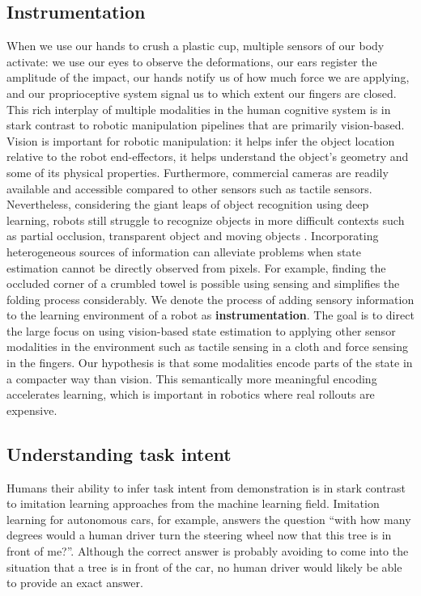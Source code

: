 \documentclass[\home/main.tex]{subfiles}
\begin{document}
\subsection{Instrumentation}
When we use our hands to crush a plastic cup, multiple sensors of our body activate: we use our eyes to observe the deformations, our ears register the amplitude of the impact, our hands notify us of how much force we are applying, and our proprioceptive system signal us to which extent our fingers are closed. This rich interplay of multiple modalities in the human cognitive system is in stark contrast to robotic manipulation pipelines that are primarily vision-based. Vision is important for robotic manipulation: it helps infer the object location relative to the robot end-effectors, it helps understand the object's geometry and some of its physical properties. Furthermore, commercial cameras are readily available and accessible compared to other sensors such as tactile sensors. Nevertheless, considering the giant leaps of object recognition using deep learning, robots still struggle to recognize objects in more difficult contexts such as partial occlusion, transparent object and moving objects \autocite{Guo2014,sajjan2019cleargrasp,Ojha2015}.
Incorporating heterogeneous sources of information can alleviate problems when state estimation cannot be directly observed from pixels. For example, finding the occluded corner of a crumbled towel is possible using sensing and simplifies the folding process considerably.
We denote the process of adding sensory information to the learning environment of a robot as \textbf{instrumentation}. The goal is to direct the large focus on using vision-based state estimation to applying other sensor modalities in the environment such as tactile sensing in a cloth and force sensing in the fingers. Our hypothesis is that some modalities encode parts of the state in a compacter way than vision. This semantically more meaningful encoding accelerates learning, which is important in robotics where real rollouts are expensive.

\subsection{Understanding task intent}
Humans their ability to infer task intent from demonstration is in stark contrast to imitation learning approaches from the machine learning field. Imitation learning for autonomous cars, for example, answers the question \enquote{with how many degrees would a human driver turn the steering wheel now that this tree is in front of me?}. 
Although the correct answer is probably avoiding to come into the situation that a tree is in front of the car, no human driver would likely be able to provide an exact answer.
\end{document}
